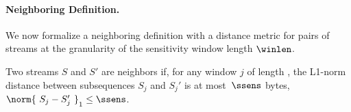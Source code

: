 \paragraph{Neighboring Definition.}
We now formalize a neighboring definition with a distance metric for pairs of
streams at the granularity of the sensitivity window length $\winlen$.

\begin{definition}
Two streams $S$ and $S'$ are neighbors if, for any  window
$j$ of length , the L1-norm distance between
sub\-sequences  $S_{j}$ and $S_{j}'$ is at most~$\ssens$ bytes, \ie
${\norm{~S_{j} - S_{j}'~}}_1 \leq \ssens$.
\label{def:neighboring-streams}
\end{definition}

